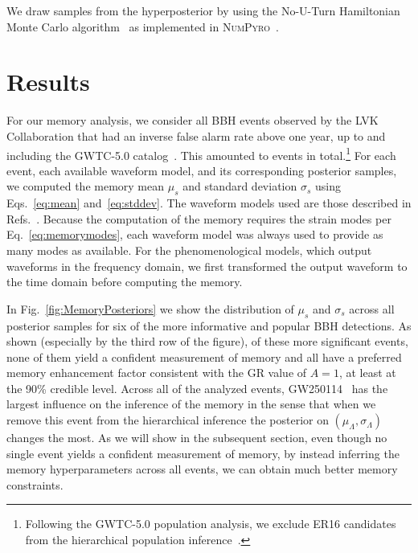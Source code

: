 \documentclass[aps,prd,reprint,twocolumn,10pt,eqsecnum,showpacs,nofootinbib,amsfonts,amssymb,amsmath,longbibliography,superscriptaddress,floatfix]{revtex4-1}
\begin{document}
We draw samples from the hyperposterior by using the No-U-Turn Hamiltonian Monte Carlo algorithm~\cite{Hoffman:2014NUTS} as implemented in \textsc{NumPyro}~\cite{bingham2019pyro,Phan:2019NumPyro}.

\section{Results}
\label{sec:results}

For our memory analysis, we consider all BBH events observed by the LVK Collaboration that had an inverse false alarm rate above one year, up to and including the GWTC-5.0 catalog~\cite{LIGOScientific:2026wfs,LIGOScientific:2026ctl}. This amounted to \Nmemoryevents events in total.\footnote{Following the GWTC-5.0 population analysis, we exclude ER16 candidates from the hierarchical population inference~\cite{LIGOScientific:2026ctl}.} For each event, each available waveform model, and its corresponding posterior samples, we computed the memory mean $\mu_{s}$ and standard deviation $\sigma_{s}$ using Eqs.~\eqref{eq:mean} and~\eqref{eq:stddev}. The waveform models used are those described in Refs.~\cite{Varma:2019csw,Pratten:2020ceb,Colleoni:2024knd,Pompili:2023tna,Ramos-Buades:2023ehm,Hamilton:2021pkf,Thompson:2023ase}. Because the computation of the memory requires the strain modes per Eq.~\eqref{eq:memorymodes}, each waveform model was always used to provide as many modes as available. For the phenomenological models, which output waveforms in the frequency domain, we first transformed the output waveform to the time domain before computing the memory.

In Fig.~\ref{fig:MemoryPosteriors} we show the distribution of $\mu_{s}$ and $\sigma_{s}$ across all posterior samples for six of the more informative and popular BBH detections. As shown (especially by the third row of the figure), of these more significant events, none of them yield a confident measurement of memory and all have a preferred memory enhancement factor consistent with the GR value of $A = 1$, at least at the 90\% credible level. Across all of the analyzed events, GW250114~\cite{LIGOScientific:2025rid,LIGOScientific:2025wao} has the largest influence on the inference of the memory in the sense that when we remove this event from the hierarchical inference the posterior on $(\mu_{\Lambda},\sigma_{\Lambda})$ changes the most. As we will show in the subsequent section, even though no single event yields a confident measurement of memory, by instead inferring the memory hyperparameters across all events, we can obtain much better memory constraints.
\end{document}
